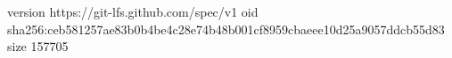 version https://git-lfs.github.com/spec/v1
oid sha256:ceb581257ae83b0b4be4c28e74b48b001cf8959cbaeee10d25a9057ddcb55d83
size 157705
